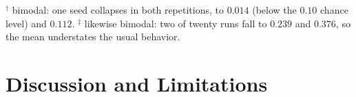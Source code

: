 \documentclass[journal]{IEEEtran}
\begin{document}
\begin{table}[t]
\centering
\caption{No-source few-shot setting, target load~3, macro-F1. Each cell is
$\text{mean} \pm \text{SD}$ over $20$ runs (ten seeds, the whole configuration
repeated twice).
Augmentations add $400$ samples per class generated from the $k$ labeled
support samples only; the last row draws from the target pool that is neither
support nor test.}
\label{tab:fewshot}
\footnotesize
{}
\par\vspace{2pt}
\footnotesize $^{\dagger}$ bimodal: one seed collapses in both repetitions, to
$0.014$ (below the $0.10$ chance level) and $0.112$. $^{\ddagger}$ likewise
bimodal: two of twenty runs fall to $0.239$ and $0.376$, so the mean understates
the usual behavior.
\end{table}

\section{Discussion and Limitations}
\label{sec:discussion}
\end{document}
